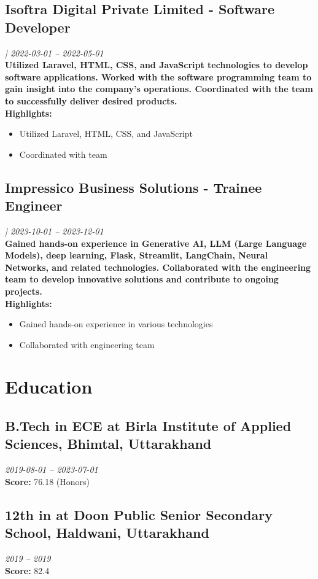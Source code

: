\documentclass{article}
\begin{document}
\subsection{Isoftra Digital Private Limited - Software Developer}
\textit{ | 2022-03-01 -- 2022-05-01}\\
\textbf{Utilized Laravel, HTML, CSS, and JavaScript technologies to develop software applications. Worked with the software programming team to gain insight into the company's operations. Coordinated with the team to successfully deliver desired products.}\\
\textbf{Highlights:}
\begin{itemize}
\item Utilized Laravel, HTML, CSS, and JavaScript
\item Coordinated with team
\end{itemize}

\subsection{Impressico Business Solutions - Trainee Engineer}
\textit{ | 2023-10-01 -- 2023-12-01}\\
\textbf{Gained hands-on experience in Generative AI, LLM (Large Language Models), deep learning, Flask, Streamlit, LangChain, Neural Networks, and related technologies. Collaborated with the engineering team to develop innovative solutions and contribute to ongoing projects.}\\
\textbf{Highlights:}
\begin{itemize}
\item Gained hands-on experience in various technologies
\item Collaborated with engineering team
\end{itemize}

\section{Education}
\subsection{B.Tech in ECE at Birla Institute of Applied Sciences, Bhimtal, Uttarakhand}
\textit{2019-08-01 -- 2023-07-01}\\
\textbf{Score:} 76.18 (Honors)\\

\subsection{12th in  at Doon Public Senior Secondary School, Haldwani, Uttarakhand}
\textit{2019 -- 2019}\\
\textbf{Score:} 82.4\\
\end{document}
